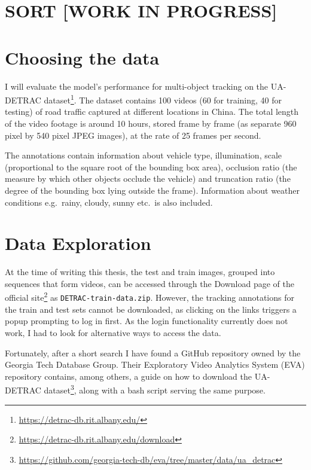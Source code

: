 

\section{SORT [WORK IN PROGRESS]}


\section{Choosing the data}

I will evaluate the model's performance for multi-object tracking on the UA-DETRAC dataset\footnote{\url{https://detrac-db.rit.albany.edu/}}. The dataset contains 100 videos (60 for training, 40 for testing) of road traffic captured at different locations in China. The total length of the video footage is around 10 hours, stored frame by frame (as separate 960 pixel by 540 pixel JPEG images), at the rate of 25 frames per second.

The annotations contain information about vehicle type, illumination, scale (proportional to the square root of the bounding box area), occlusion ratio (the measure by which other objects occlude the vehicle) and truncation ratio (the degree of the bounding box lying outside the frame). Information about weather conditions e.g.~rainy, cloudy, sunny etc.~is also included.


\section{Data Exploration}

At the time of writing this thesis, the test and train images, grouped into sequences that form videos, can be accessed through the Download page of the official site\footnote{\url{https://detrac-db.rit.albany.edu/download}} as \verb|DETRAC-train-data.zip|. However, the tracking annotations for the train and test sets cannot be downloaded, as clicking on the links triggers a popup prompting to log in first. As the login functionality currently does not work, I had to look for alternative ways to access the data.  

Fortunately, after a short search I have found a GitHub repository owned by the Georgia Tech Database Group. Their Exploratory Video Analytics System (EVA) repository contains, among others, a guide on how to download the UA-DETRAC dataset\footnote{\url{https://github.com/georgia-tech-db/eva/tree/master/data/ua_detrac}}, along with a bash script serving the same purpose.

